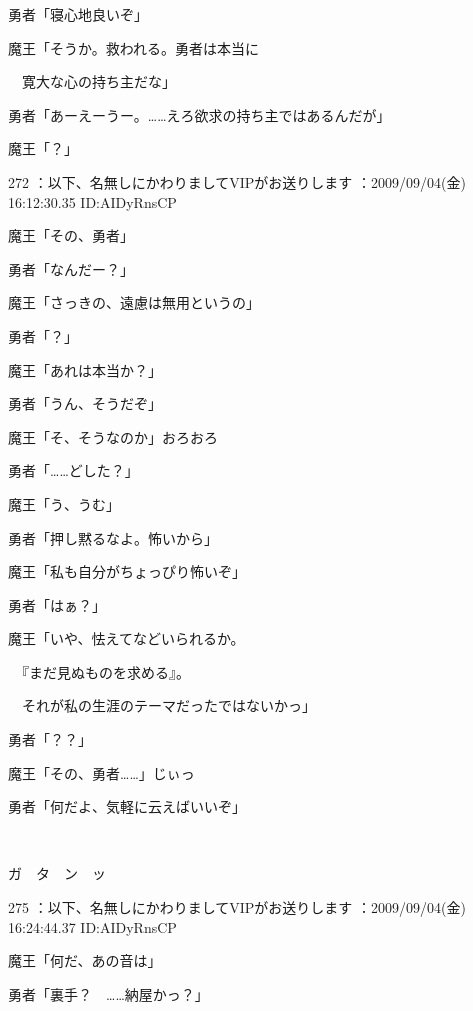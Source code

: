 \documentclass[a4j,twocolumn]{tarticle}
\begin{document}
勇者「寝心地良いぞ」\par{} 
魔王「そうか。救われる。勇者は本当に\par{} 
　寛大な心の持ち主だな」 



勇者「あーえーうー。……えろ欲求の持ち主ではあるんだが」\par{} 
魔王「？」

	
    
    

272 ：以下、名無しにかわりましてVIPがお送りします ：2009/09/04(金) 16:12:30.35 ID:AIDyRnsCP 


魔王「その、勇者」\par{} 
勇者「なんだー？」 



魔王「さっきの、遠慮は無用というの」\par{} 
勇者「？」\par{} 
魔王「あれは本当か？」\par{} 
勇者「うん、そうだぞ」 



魔王「そ、そうなのか」おろおろ\par{} 
勇者「……どした？」 



魔王「う、うむ」\par{} 
勇者「押し黙るなよ。怖いから」\par{} 
魔王「私も自分がちょっぴり怖いぞ」\par{} 
勇者「はぁ？」 



魔王「いや、怯えてなどいられるか。\par{} 
　『まだ見ぬものを求める』。\par{} 
　それが私の生涯のテーマだったではないかっ」\par{} 
勇者「？？」 



魔王「その、勇者……」じぃっ\par{} 
勇者「何だよ、気軽に云えばいいぞ」 

　　

ガ　タ　ン　ッ 

	
    
    

275 ：以下、名無しにかわりましてVIPがお送りします ：2009/09/04(金) 16:24:44.37 ID:AIDyRnsCP 


魔王「何だ、あの音は」\par{} 
勇者「裏手？　……納屋かっ？」 
\end{document}
